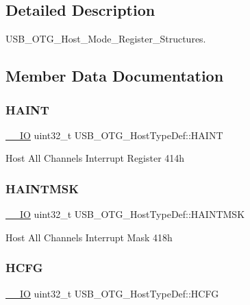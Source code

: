 \subsection{Detailed Description}
U\+S\+B\+\_\+\+O\+T\+G\+\_\+\+Host\+\_\+\+Mode\+\_\+\+Register\+\_\+\+Structures. 

\subsection{Member Data Documentation}
\mbox{\label{struct_u_s_b___o_t_g___host_type_def_af3c15285d6f2efdf4890ea5b27258aca}} 
\subsubsection{\texorpdfstring{HAINT}{HAINT}}
{\footnotesize\ttfamily \mbox{\hyperlink{core__sc300_8h_aec43007d9998a0a0e01faede4133d6be}{\+\_\+\+\_\+\+IO}} uint32\+\_\+t U\+S\+B\+\_\+\+O\+T\+G\+\_\+\+Host\+Type\+Def\+::\+H\+A\+I\+NT}

Host All Channels Interrupt Register 414h \mbox{\label{struct_u_s_b___o_t_g___host_type_def_aa4ec75921a9699f77ee14f377e1b86dc}} 
\subsubsection{\texorpdfstring{HAINTMSK}{HAINTMSK}}
{\footnotesize\ttfamily \mbox{\hyperlink{core__sc300_8h_aec43007d9998a0a0e01faede4133d6be}{\+\_\+\+\_\+\+IO}} uint32\+\_\+t U\+S\+B\+\_\+\+O\+T\+G\+\_\+\+Host\+Type\+Def\+::\+H\+A\+I\+N\+T\+M\+SK}

Host All Channels Interrupt Mask 418h \mbox{\label{struct_u_s_b___o_t_g___host_type_def_ab44a72e139c005445aac54e866f7750f}} 
\subsubsection{\texorpdfstring{HCFG}{HCFG}}
{\footnotesize\ttfamily \mbox{\hyperlink{core__sc300_8h_aec43007d9998a0a0e01faede4133d6be}{\+\_\+\+\_\+\+IO}} uint32\+\_\+t U\+S\+B\+\_\+\+O\+T\+G\+\_\+\+Host\+Type\+Def\+::\+H\+C\+FG}

